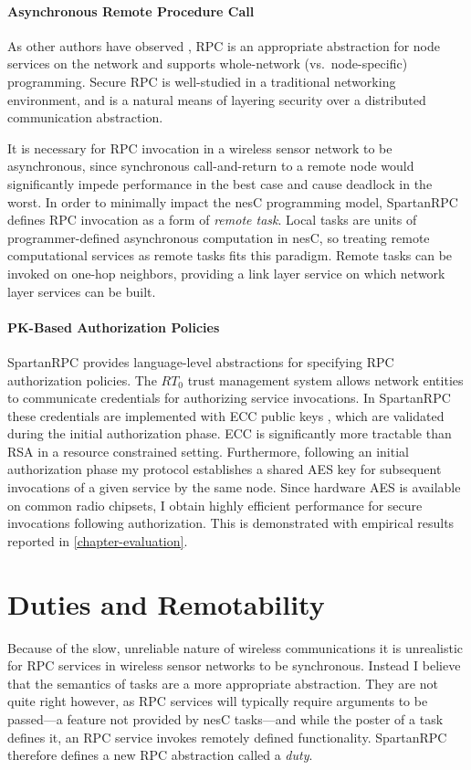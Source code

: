 \paragraph{Asynchronous Remote Procedure Call} As other authors have observed
\cite{may-tinyrpc-2007}, RPC is an appropriate abstraction for node services on the network and
supports whole-network (vs.~node-specific) programming. Secure RPC is well-studied in a
traditional networking environment, and is a natural means of layering security over a
distributed communication abstraction.

It is necessary for RPC invocation in a wireless sensor network to be asynchronous, since
synchronous call-and-return to a remote node would significantly impede performance in the best
case and cause deadlock in the worst. In order to minimally impact the nesC programming model,
SpartanRPC defines RPC invocation as a form of \emph{remote task}. Local tasks are units of
programmer-defined asynchronous computation in nesC, so treating remote computational services
as remote tasks fits this paradigm. Remote tasks can be invoked on one-hop neighbors, providing
a link layer service on which network layer services can be built.

\paragraph{PK-Based Authorization Policies} SpartanRPC provides language-level abstractions for
specifying RPC authorization policies. The $RT_0$ trust management system allows network
entities to communicate credentials for authorizing service invocations. In SpartanRPC these
credentials are implemented with ECC public keys \cite{bertoni-2006}, which are validated during
the initial authorization phase. ECC is significantly more tractable than RSA in a resource
constrained setting. Furthermore, following an initial authorization phase my protocol
establishes a shared AES key for subsequent invocations of a given service by the same node.
Since hardware AES is available on common radio chipsets, I obtain highly efficient performance
for secure invocations following authorization. This is demonstrated with empirical results
reported in \autoref{chapter-evaluation}.

\section{Duties and Remotability}
\label{section-duties}

Because of the slow, unreliable nature of wireless communications it is unrealistic for RPC
services in wireless sensor networks to be synchronous. Instead I believe that the semantics of
tasks are a more appropriate abstraction. They are not quite right however, as RPC services will
typically require arguments to be passed---a feature not provided by nesC tasks---and while the
poster of a task defines it, an RPC service invokes remotely defined functionality. SpartanRPC
therefore defines a new RPC abstraction called a \emph{duty}.

